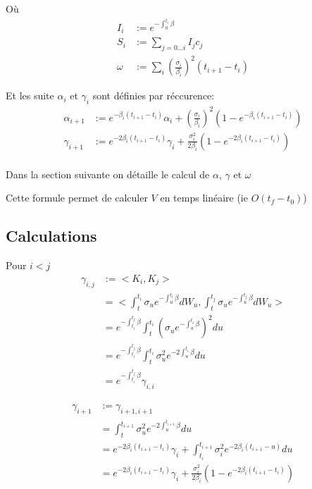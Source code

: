 Où
\begin{align*}
  I_i &:= e^{-\int^{t_i}_0 \beta} \\
  S_i &:= \sum_{j = 0...i} I_j c_j \\
  \omega &:= \sum_i  (\frac{\sigma_i}{\beta_i})^2 (t_{i+1} - t_i)
\end{align*}

Et les suite $\alpha_i$ et $\gamma_i$ sont définies par réccurence:
  \begin{align*}
    \alpha_{i+1} &:= e^{-\beta_i (t_{i+1} - t_i)} \alpha_i + (\frac{\sigma_i}{\beta_i})^2 (1 - e^{-\beta_i(t_{i+1} - t_i)}) \\
    \gamma_{i+1} &:= e^{-2 \beta_i (t_{i+1} - t_i)} \gamma_i + \frac{\sigma_i^2}{2 \beta_i} (1 - e^{-2 \beta_i(t_{i+1} - t_i)})\\
\end{align*}
    
Dans la section suivante on détaille le calcul de $\alpha$, $\gamma$ et $\omega$

Cette formule permet de calculer $V$ en temps linéaire (ie $O(t_f - t_0)$)
\subsection*{Calculations}

Pour $i < j$
\begin{align*}
\gamma_{i, j} &:= <K_i, K_j>  \\
&= < \int_{t}^{t_i}\sigma_u e^{-\int_u^{t_i} \beta} dW_u,
\int_{t}^{t_j}\sigma_u e^{-\int_u^{t_j} \beta} dW_u > \\
&= e^{-\int_{t_i}^{t_j} \beta} \int_t^{t_i} (\sigma_u e^{-\int_u^{t_i} \beta})^2 du \\
&= e^{-\int_{t_i}^{t_j} \beta} \int_t^{t_i} \sigma_u^2 e^{-2 \int_u^{t_i} \beta} du \\
&= e^{-\int_{t_i}^{t_j} \beta} \gamma_{i, i}
\end{align*}

\begin{align*}
\gamma_{i+1} &:= \gamma_{i+1, i+1} \\
&= \int_t^{t_{i+1}} \sigma_u^2 e^{-2 \int_u^{t_{i+1}} \beta} du \\
&= e^{-2 \beta_i (t_{i+1} - t_i)} \gamma_i + \int_{t_i}^{t_{i+1}} \sigma_i^2 e^{-2 \beta_i(t_{i+1} - u)} du \\
&= e^{-2 \beta_i (t_{i+1} - t_i)} \gamma_i + \frac{\sigma_i^2}{2 \beta_i} (1 - e^{-2 \beta_i(t_{i+1} - t_i)})
\end{align*}


